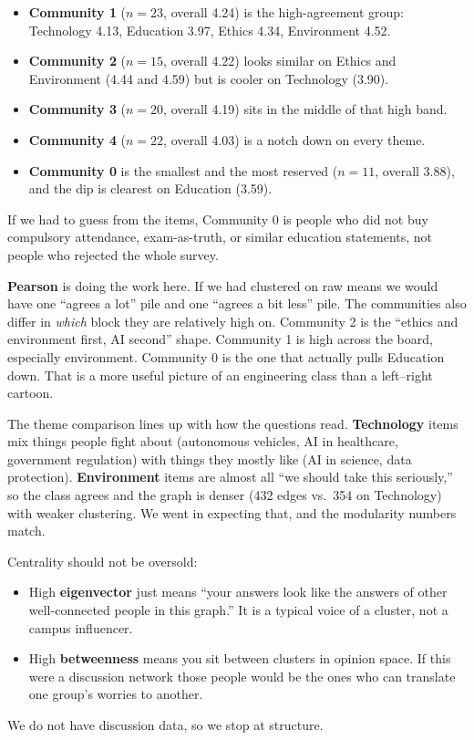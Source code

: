 \documentclass[11pt,a4paper]{article}
\begin{document}
\begin{itemize}
  \item \textbf{Community 1} ($n=23$, overall 4.24) is the high-agreement group: Technology 4.13, Education 3.97, Ethics 4.34, Environment 4.52.
  \item \textbf{Community 2} ($n=15$, overall 4.22) looks similar on Ethics and Environment (4.44 and 4.59) but is cooler on Technology (3.90).
  \item \textbf{Community 3} ($n=20$, overall 4.19) sits in the middle of that high band.
  \item \textbf{Community 4} ($n=22$, overall 4.03) is a notch down on every theme.
  \item \textbf{Community 0} is the smallest and the most reserved ($n=11$, overall 3.88), and the dip is clearest on Education (3.59).
\end{itemize}
If we had to guess from the items, Community 0 is people who did not buy compulsory attendance, exam-as-truth, or similar education statements, not people who rejected the whole survey.

\textbf{Pearson} is doing the work here. If we had clustered on raw means we would have one ``agrees a lot'' pile and one ``agrees a bit less'' pile. The communities also differ in \emph{which} block they are relatively high on. Community 2 is the ``ethics and environment first, AI second'' shape. Community 1 is high across the board, especially environment. Community 0 is the one that actually pulls Education down. That is a more useful picture of an engineering class than a left--right cartoon.

The theme comparison lines up with how the questions read. \textbf{Technology} items mix things people fight about (autonomous vehicles, AI in healthcare, government regulation) with things they mostly like (AI in science, data protection). \textbf{Environment} items are almost all ``we should take this seriously,'' so the class agrees and the graph is denser (432 edges vs.\ 354 on Technology) with weaker clustering. We went in expecting that, and the modularity numbers match.

Centrality should not be oversold:
\begin{itemize}
  \item High \textbf{eigenvector} just means ``your answers look like the answers of other well-connected people in this graph.'' It is a typical voice of a cluster, not a campus influencer.
  \item High \textbf{betweenness} means you sit between clusters in opinion space. If this were a discussion network those people would be the ones who can translate one group's worries to another.
\end{itemize}
We do not have discussion data, so we stop at structure.
\end{document}

